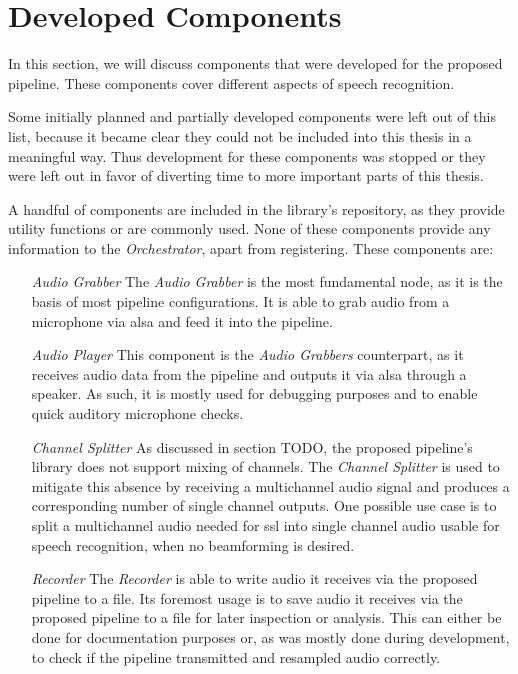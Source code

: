 
\section{Developed Components}
\label{main:components:start}
In this section, we will discuss components that were developed for the proposed pipeline.
These components cover different aspects of speech recognition.

Some initially planned and partially developed components were left out of this list, because it became clear they could not be included into this thesis in a meaningful way.
Thus development for these components was stopped or they were left out in favor of diverting time to more important parts of this thesis.


A handful of components are included in the library's repository, as they provide utility functions or are commonly used.
None of these components provide any information to the \textit{Orchestrator}, apart from registering.
These components are:
\begin{itemize}[leftmargin=1in]
	\item[\textit{Audio Grabber}] The \textit{Audio Grabber} is the most fundamental node, as it is the basis of most pipeline configurations.
	It is able to grab audio from a microphone via \gls{alsa} and feed it into the pipeline.

	\item[\textit{Audio Player}] This component is the \textit{Audio Grabbers} counterpart, as it receives audio data from the pipeline and outputs it via \gls{alsa} through a speaker.
	As such, it is mostly used for debugging purposes and to enable quick auditory microphone checks.

	\item[\textit{Channel Splitter}] As discussed in section TODO, the proposed pipeline's library does not support mixing of channels.
	The \textit{Channel Splitter} is used to mitigate this absence by receiving a multichannel audio signal and produces a corresponding number of single channel outputs.
	One possible use case is to split a multichannel audio needed for \gls{ssl} into single channel audio usable for speech recognition, when no beamforming is desired.

	\item[\textit{Recorder}] The \textit{Recorder} is able to write audio it receives via the proposed pipeline to a file.
	Its foremost usage is to save audio it receives via the proposed pipeline to a file for later inspection or analysis.
	This can either be done for documentation purposes or, as was mostly done during development, to check if the pipeline transmitted and resampled audio correctly.
\end{itemize}



